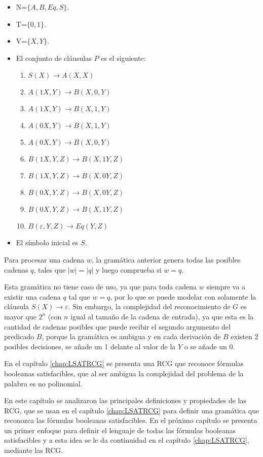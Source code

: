 \begin{itemize}
    \item  N=$\{A,B,Eq,S\}$.
    \item T=$\{0,1\}$.
    \item V=$\{X,Y\}$.
    \item El conjunto de cláusulas $P$ es el siguiente:
          \begin{enumerate}
              \item $S(X)\to A(X,X)$
              \item $A(1X,Y)\to B(X,0,Y)$
              \item $A(1X,Y)\to B(X,1,Y)$
              \item $A(0X,Y)\to B(X,1,Y)$
              \item $A(0X,Y)\to B(X,0,Y)$
              \item $B(1X,Y,Z)\to B(X,1Y,Z)$
              \item $B(1X,Y,Z)\to B(X,0Y,Z)$
              \item $B(0X,Y,Z)\to B(X,0Y,Z)$
              \item $B(0X,Y,Z)\to B(X,1Y,Z)$
              \item $B(\varepsilon,Y,Z)\to Eq(Y,Z)$
          \end{enumerate}
          
    \item El símbolo inicial es $S$.
\end{itemize}

Para procesar una cadena $w$, la gramática anterior genera todas las posibles cadenas $q$, tales que $|w|=|q|$ y luego comprueba si $w = q$.

Esta gramática no tiene caso de uso, ya que para toda cadena $w$ siempre va a existir una cadena $q$ tal que $w=q$, 
por lo que se puede modelar con solamente la cláusula $S(X)\to \varepsilon$. Sin embargo, la complejidad del 
reconocimiento de $G$ es mayor que $2^n$ (con $n$ igual al tamaño de la cadena de entrada), ya que esta es la 
cantidad de cadenas posibles que puede recibir el segundo argumento del predicado $B$, porque la gramática es 
ambigua y en cada derivación de $B$ existen 2 posibles decisiones, se añade un 1 delante al valor de la $Y$ o 
se añade un $0$.

En el capítulo \ref{chap:LSATRCG} se presenta una RCG que reconoce fórmulas booleanas satisfacibles, que al ser ambigua la complejidad del problema de la palabra es no polinomial.

En este capítulo se analizaron las principales definiciones y propiedades de las RCG, que se usan en el capítulo \ref{chap:LSATRCG} para definir una gramática que reconozca las fórmulas booleanas satisfacibles.  En el próximo capítulo se presenta un primer enfoque para definir el lenguaje de todas las fórmulas booleanas satisfacibles y a esta idea se le da continuidad en el capítulo \ref{chap:LSATRCG}, mediante las RCG.
